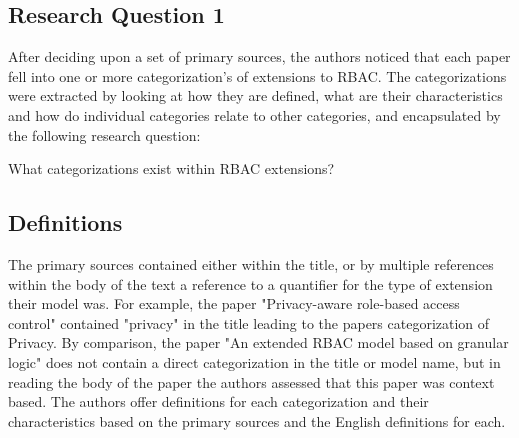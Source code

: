 \subsection{Research Question 1}

After deciding upon a set of primary sources, the authors noticed that each paper fell into one or more categorization's of extensions to RBAC.
The categorizations were extracted by looking at how they are defined, what are their characteristics and how do individual categories relate
to other categories, and encapsulated by the following research question:

What categorizations exist within RBAC extensions? \\

\subsection{Definitions}

The primary sources contained either within the title, or by multiple references within the body of the text a reference to a quantifier for the
type of extension their model was.  For example, the paper "Privacy-aware role-based access control" \cite{ni2010privacy} contained "privacy" in
the title leading to the papers categorization of Privacy.  By comparison, the paper "An extended RBAC model based on granular logic" \cite{jian2008extended}
does not contain a direct categorization in the title or model name, but in reading the body of the paper the authors assessed that this paper was 
context based.  The authors offer definitions for each categorization and their characteristics based on the primary sources and the English definitions
for each.

